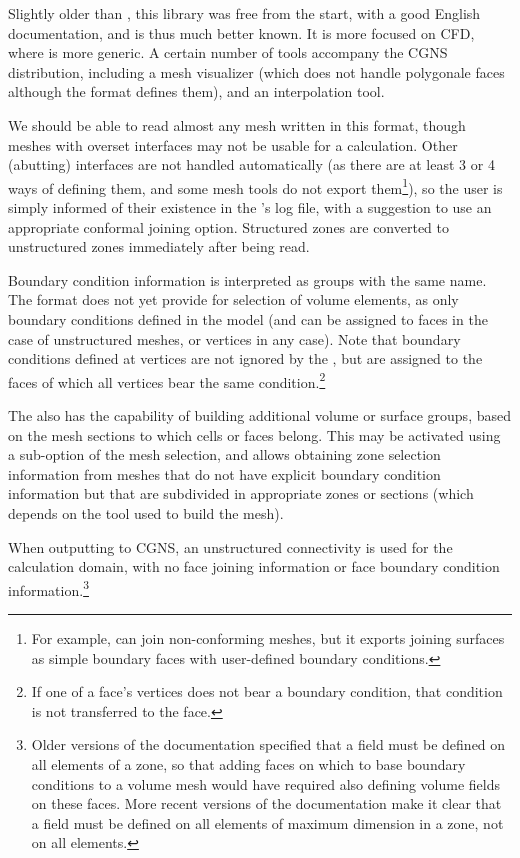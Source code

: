 {{{Slightly older than \med, this library was free from the start, with a good
English documentation, and is thus much better known. It is more focused
on CFD, where \med is more generic. A certain number of tools accompany
the CGNS distribution, including a mesh visualizer (which does not handle
polygonale faces although the format defines them), and an interpolation
tool.

We should be able to read almost any mesh written in this format, though
meshes with overset interfaces may not be usable for a calculation.
Other (abutting) interfaces are not handled automatically (as there are
at least 3 or 4 ways of defining them, and some mesh tools do not export
them\footnote{For example, \icemcfd can join non-conforming meshes, but it
exports joining surfaces as simple boundary faces with user-defined boundary
conditions.}), so the user is simply informed of their existence in the
\pcs's log file, with a suggestion to use an appropriate conformal joining
option. Structured zones are converted to unstructured zones immediately after
being read.

Boundary condition information is interpreted as groups with the same
name. The format does not yet provide for selection of volume elements,
as only boundary conditions defined in the model (and can be assigned to
faces in the case of unstructured meshes, or vertices in any case).
Note that boundary conditions defined at vertices are not ignored by
the \pcs, but are assigned to the faces of which all vertices bear
the same condition.\footnote{If one of a face's vertices does not bear
a boundary condition, that condition is not transferred to the face.}

The \pcs also has the capability of building additional volume or surface groups,
based on the mesh sections to which cells or faces belong. This may be
activated using a sub-option of the mesh selection, and allows obtaining
zone selection information from meshes that do not have explicit
boundary condition information but that are subdivided in appropriate zones or
sections (which depends on the tool used to build the mesh).

When outputting to CGNS, an unstructured connectivity is used for the calculation
domain, with no face joining information or face boundary condition
information.\footnote{Older versions of the documentation specified that
a field must be defined on all elements of a zone, so that adding faces
on which to base boundary conditions to a volume mesh would have required
also defining volume fields on these faces. More recent versions of the
documentation make it clear that a field must be defined on all elements
of maximum dimension in a zone, not on all elements.} 

}}}
